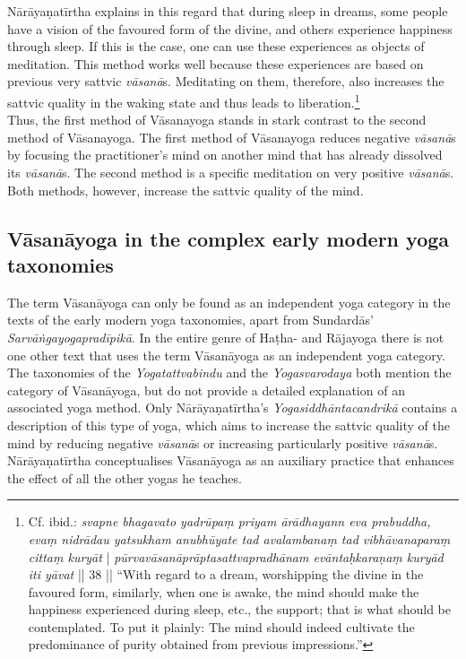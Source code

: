 Nārāyaṇatīrtha explains in this regard that during sleep in dreams, some people have a vision of the favoured form of the divine, and others experience happiness through sleep. If this is the case, one can use these experiences as objects of meditation. This method works well because these experiences are based on previous very sattvic \textit{vāsanā}s. Meditating on them, therefore, also increases the sattvic quality in the waking state and thus leads to liberation.\footnote{Cf. ibid.: \textit{svapne bhagavato yadrūpaṃ priyam ārādhayann eva prabuddha, evaṃ nidrādau yatsukham anubhūyate tad avalambanaṃ tad vibhāvanaparaṃ cittaṃ kuryāt} | \textit{pūrvavāsanāprāptasattvapradhānam evāntaḥkaraṇaṃ kuryād iti yāvat} || 38 || ``With regard to a dream, worshipping the divine in the favoured form, similarly, when one is awake, the mind should make the happiness experienced during sleep, etc., the support; that is what should be contemplated. To put it plainly: The mind should indeed cultivate the predominance of purity obtained from previous impressions.''}\\

Thus, the first method of Vāsanayoga stands in stark contrast to the second method of Vāsanayoga. The first method of Vāsanayoga reduces negative \textit{vāsanā}s by focusing the practitioner's mind on another mind that has already dissolved its \textit{vāsanā}s. The second method is a specific meditation on very positive \textit{vāsanā}s. Both methods, however, increase the sattvic quality of the mind.      

\subsection{Vāsanāyoga in the complex early modern yoga taxonomies}

The term Vāsanāyoga can only be found as an independent yoga category in the texts of the early modern yoga taxonomies, apart from Sundardās' \emph{Sarvāṅgayogapradīpikā}. In the entire genre of Haṭha- and Rājayoga there is not one other text that uses the term Vāsanāyoga as an independent yoga category. The taxonomies of the \emph{Yogatattvabindu} and the \emph{Yogasvarodaya} both mention the category of Vāsanāyoga, but do not provide a detailed explanation of an associated yoga method. Only Nārāyaṇatīrtha's \emph{Yogasiddhāntacandrikā} contains a description of this type of yoga, which aims to increase the sattvic quality of the mind by reducing negative \textit{vāsanā}s or increasing particularly positive \emph{vāsanā}s. Nārāyaṇatīrtha conceptualises Vāsanāyoga as an auxiliary practice that enhances the effect of all the other yogas he teaches.

